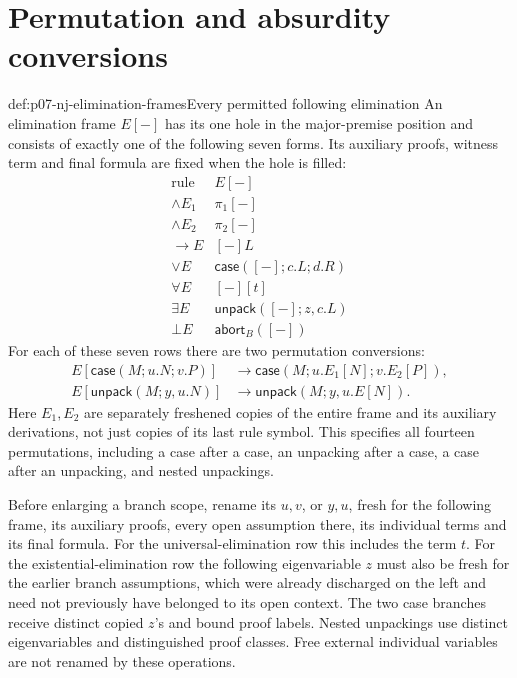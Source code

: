\section{Permutation and absurdity conversions}

\begin{hbdefinition}{def:p07-nj-elimination-frames}{Every permitted following elimination}
An elimination frame \(E[-]\) has its one hole in the major-premise
position and consists of exactly one of the following seven forms.
Its auxiliary proofs, witness term and final formula are fixed when
the hole is filled:
\[
\begin{array}{c|l}
\text{rule}&E[-]\\ \hline
\land E_1&\pi_1[-]\\
\land E_2&\pi_2[-]\\
\to E&[-]L\\
\lor E&\mathsf{case}([-];c.L;d.R)\\
\forall E&[-][t]\\
\exists E&\mathsf{unpack}([-];z,c.L)\\
\bot E&\mathsf{abort}_B([-])
\end{array}
\]
For each of these seven rows there are two permutation conversions:
\[
\begin{aligned}
 E[\mathsf{case}(M;u.N;v.P)]
 &\longrightarrow
   \mathsf{case}(M;u.E_1[N];v.E_2[P]),\\
 E[\mathsf{unpack}(M;y,u.N)]
 &\longrightarrow
   \mathsf{unpack}(M;y,u.E[N]).
\end{aligned}
\]
Here \(E_1,E_2\) are separately freshened copies of the entire
frame and its auxiliary derivations, not just copies of its last
rule symbol. This specifies all fourteen permutations, including
a case after a case, an unpacking after a case, a case after an
unpacking, and nested unpackings.

Before enlarging a branch scope, rename its \(u,v\), or \(y,u\),
fresh for the following frame, its auxiliary proofs, every open
assumption there, its individual terms and its final formula.
For the universal-elimination row this includes the term \(t\).
For the existential-elimination row the following eigenvariable
\(z\) must also be fresh for the earlier branch assumptions,
which were already discharged on the left and need not previously
have belonged to its open context. The two case branches receive
distinct copied \(z\)'s and bound proof labels. Nested unpackings
use distinct eigenvariables and distinguished proof classes.
Free external individual variables are not renamed by these operations.
\end{hbdefinition}

